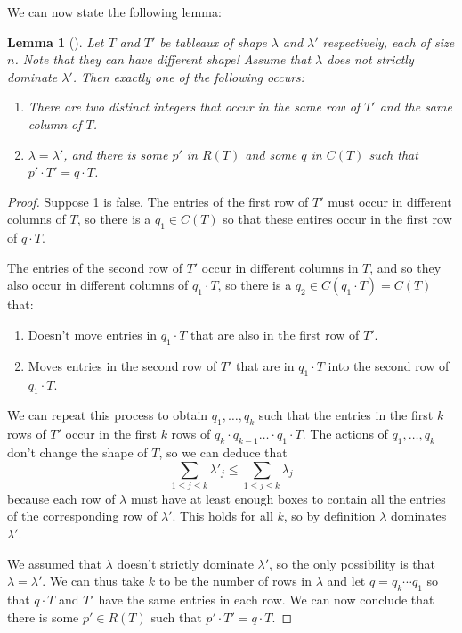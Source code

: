 \documentclass[12pt,twoside]{reedthesis}
\theoremstyle{plain}   %
\newtheorem{lemma}{Lemma}[section]
\theoremstyle{definition}
\theoremstyle{remark}
\numberwithin{equation}{section}
\begin{document}
  We can now state the following lemma:
  \begin{lemma}[{\cite[Lemma 7.1]{fulton}}] \label{lem1}
    Let $T$ and $T'$ be tableaux of shape $\lambda$ and $\lambda'$ respectively, each of size $n$. Note that they can have different shape!
    Assume that $\lambda$ does not strictly dominate $\lambda'$.
    Then exactly one of the following occurs:
    \begin{enumerate}
    \item There are two distinct integers that occur in the same row of $T'$ and the same column of $T$.
    \item $\lambda = \lambda'$, and there is some $p'$ in $R(T)$ and some $q$ in $C(T)$ such that $p' \cdot T' = q \cdot T$.
    \end{enumerate}
  \end{lemma}
  \begin{proof}
    Suppose 1 is false. The entries of the first row of $T'$ must occur in different columns of $T$,
    so there is a $q_1 \in C(T)$ so that these entires occur in the first row of $q \cdot T$.\par
    The entries of the second row of $T'$ occur in different columns in $T$, and so they also occur in different columns of $q_1 \cdot T$,
    so there is a $q_2 \in C(q_1 \cdot T) = C(T)$ that:
    \begin{enumerate}
    \item Doesn't move entries in $q_1 \cdot T$ that are also in the first row of $T'$.
    \item Moves entries in the second row of $T'$ that are in $q_1 \cdot T$
      into the second row of $q_1 \cdot T$.
    \end{enumerate}
    We can repeat this process to obtain $q_1, \dots, q_k$ such that the entries in the first $k$ rows of $T'$ occur in the first $k$ rows of
    $q_k \cdot q_{k-1} \dots \cdot q_1 \cdot T$. The actions of $q_1, \dots, q_k$ don't change the shape of $T$, so we can deduce that
    \[\sum_{1 \leq j \leq k} \lambda'_j \leq \sum_{1 \leq j \leq k} \lambda_j\]
    because each row of $\lambda$ must have at least enough boxes to contain all the entries of the corresponding row of $\lambda'$.
    This holds for all $k$, so by definition $\lambda$ dominates $\lambda'$. \par
    We assumed that $\lambda$ doesn't strictly dominate $\lambda'$, so the only possibility is that $\lambda = \lambda'$.
    We can thus take $k$ to be the number of rows in $\lambda$ and let $q = q_k \cdots q_1$ so that
    $q \cdot T$ and $T'$ have the same entries in each row.
    We can now conclude that there is some $p' \in R(T)$ such that $p' \cdot T' = q \cdot T$.
  \end{proof}
\end{document}
